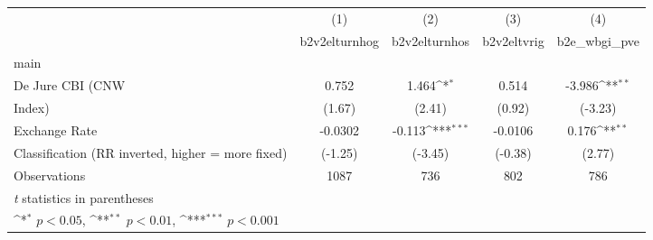 {
\def\sym#1{\ifmmode^{#1}\else\(^{#1}\)\fi}
\begin{tabular}{l*{4}{c}}
\toprule
                &\multicolumn{1}{c}{(1)}&\multicolumn{1}{c}{(2)}&\multicolumn{1}{c}{(3)}&\multicolumn{1}{c}{(4)}\\
                &\multicolumn{1}{c}{b2v2elturnhog}&\multicolumn{1}{c}{b2v2elturnhos}&\multicolumn{1}{c}{b2v2eltvrig}&\multicolumn{1}{c}{b2e\_wbgi\_pve}\\
\midrule
main            &                  &                  &                  &                  \\
De Jure CBI (CNW&    0.752         &    1.464\sym{*}  &    0.514         &   -3.986\sym{**} \\
Index)          &   (1.67)         &   (2.41)         &   (0.92)         &  (-3.23)         \\
\addlinespace
Exchange Rate   &  -0.0302         &   -0.113\sym{***}&  -0.0106         &    0.176\sym{**} \\
Classification (RR inverted, higher = more fixed)&  (-1.25)         &  (-3.45)         &  (-0.38)         &   (2.77)         \\
\midrule
Observations    &     1087         &      736         &      802         &      786         \\
\bottomrule
\multicolumn{5}{l}{\footnotesize \textit{t} statistics in parentheses}\\
\multicolumn{5}{l}{\footnotesize \sym{*} \(p<0.05\), \sym{**} \(p<0.01\), \sym{***} \(p<0.001\)}\\
\end{tabular}
}

